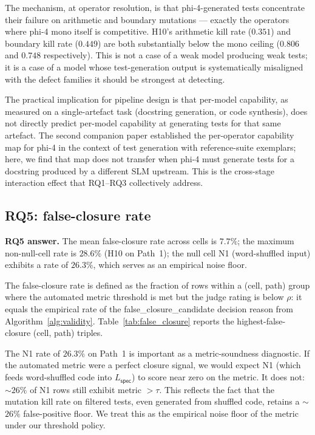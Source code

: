 The mechanism, at operator resolution, is that phi-4-generated tests concentrate their failure on arithmetic and boundary mutations --- exactly the operators where phi-4 mono itself is competitive. H10's arithmetic kill rate ($0.351$) and boundary kill rate ($0.449$) are both substantially below the mono ceiling ($0.806$ and $0.748$ respectively). This is not a case of a weak model producing weak tests; it is a case of a model whose test-generation output is systematically misaligned with the defect families it should be strongest at detecting.

The practical implication for pipeline design is that per-model capability, as measured on a single-artefact task (docstring generation, or code synthesis), does not directly predict per-model capability at generating tests for that same artefact. The second companion paper established the per-operator capability map for phi-4 in the context of test generation with reference-suite exemplars; here, we find that map does not transfer when phi-4 must generate tests for a docstring produced by a different SLM upstream. This is the cross-stage interaction effect that RQ1--RQ3 collectively address.

\subsection{RQ5: false-closure rate}

\textbf{RQ5 answer.} The mean false-closure rate across cells is $7.7\%$; the maximum non-null-cell rate is $28.6\%$ (H10 on Path~1); the null cell N1 (word-shuffled input) exhibits a rate of $26.3\%$, which serves as an empirical noise floor.



The false-closure rate is defined as the fraction of rows within a (cell, path) group where the automated metric threshold is met but the judge rating is below $\rho$: it equals the empirical rate of the \textsf{false\_closure\_candidate} decision reason from Algorithm~\ref{alg:validity}. Table~\ref{tab:false_closure} reports the highest-false-closure (cell, path) triples.

The N1 rate of $26.3\%$ on Path~1 is important as a metric-soundness diagnostic. If the automated metric were a perfect closure signal, we would expect N1 (which feeds word-shuffled code into $L_{\textsf{spec}}$) to score near zero on the metric. It does not: $\sim$$26\%$ of N1 rows still exhibit metric $> \tau$. This reflects the fact that the mutation kill rate on filtered tests, even generated from shuffled code, retains a $\sim$$26\%$ false-positive floor. We treat this as the empirical noise floor of the metric under our threshold policy.

